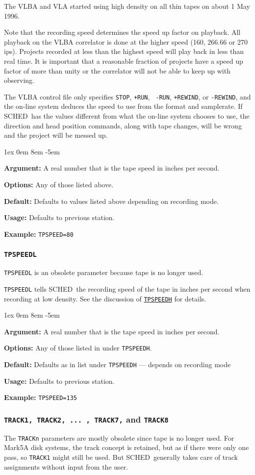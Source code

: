 \documentclass{report}
\newcommand{\schedb}{{\sc SCHED~}}
\newcommand{\rcwbox}[5]{
  \begin{list}{}{\parsep 1ex  \itemsep 0em
                 \leftmargin 8em  \itemindent -5em }
    \item {\bf Argument:} #1
    \item {\bf Options:}  #2
    \item {\bf Default:}  #3
    \item {\bf Usage:}    #4
    \item {\bf Example:}  #5
  \end{list}
}
\begin{document}
The VLBA and VLA started using high density on all thin tapes on
about 1 May 1996.

Note that the recording speed determines the speed up factor on
playback.  All playback on the VLBA correlator is done at the higher
speed (160, 266.66 or 270 ips).  Projects recorded at less than the
highest speed will play back in less than real time.  It is important
that a reasonable fraction of projects have a speed up factor of more
than unity or the correlator will not be able to keep up with
observing.

The VLBA control file only specifies {\tt STOP}, {\tt +RUN}, {\tt
-RUN}, {\tt +REWIND}, or {\tt -REWIND}, and the on-line system deduces
the speed to use from the format and samplerate.  If \schedb has
the values different from what the on-line system chooses to use, the
direction and head position commands, along with tape changes, will be
wrong and the project will be messed up.


\rcwbox
{A real number that is the tape speed in inches per second.}
{Any of those listed above.}
{Defaults to values listed above depending on recording mode.}
{Defaults to previous station.}
{{\tt TPSPEED=80}}

\subsubsection{\label{SP:TPSPEEDL}{\tt TPSPEEDL}}

{\tt TPSPEEDL} is an obsolete parameter because tape is no longer used.

{\tt TPSPEEDL} tells \schedb the recording speed of the tape in inches
per second when recording at low density.  See the discussion of
{\hyperref[SP:TPSPEEDH]{{\tt TPSPEEDH}}} for details.

\rcwbox
{A real number that is the tape speed in inches per second.}
{Any of those listed in under {\tt TPSPEEDH}.}
{Defaults as in list under {\tt TPSPEEDH} --- depends on recording
mode}
{Defaults to previous station.}
{{\tt TPSPEED=135}}


\subsubsection{\label{SP:TRACK1}
{\tt TRACK1, TRACK2, ... , TRACK7,} and {\tt TRACK8}}

The {\tt TRACKn} parameters are mostly obsolete since tape is no
longer used.  For Mark5A disk systems, the track concept is retained,
but as if there were only one pass, so {\tt TRACK1} might still be
used.  But \schedb generally takes care of track assignments without
input from the user.
\end{document}
